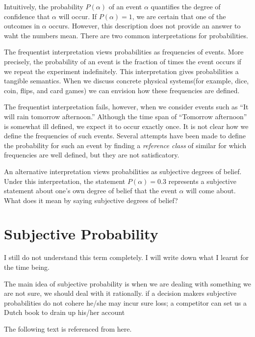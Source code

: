\documentclass[a4paper]{book}
\begin{document}
	Intuitively, the probability $P(\alpha)$ of an event $\alpha$
	quantifies the degree of confidence that $\alpha$ will occur. If
	$P(\alpha) = 1$, we are certain that one of the outcomes in $\alpha$
	occurs. However, this description does not provide an answer to waht
	the numbers mean. There are two common interpretations for
	probabilities.\cite{koller2009probabilistic}

	The frequentist interpretation views probabilities as frequencies of
	events. More precisely, the probability of an event is the fraction of
	times the event occurs if we repeat the experiment indefinitely. This
	interpretation gives probabilities a tangible semantics. When we
	discuss concrete physical systems(for example, dice, coin, flips, and
	card games) we can envision how these frequencies are
	defined.\cite{koller2009probabilistic}

	The frequentist interpretation fails, however, when we consider events
	such as ``It will rain tomorrow afternoon.'' Although the time span of
	``Tomorrow afternoon'' is somewhat ill defined, we expect it to occur
	exactly once. It is not clear how we define the frequencies of such
	events. Several attempts have been made to define the probability for
	such an event by finding a \textit{reference class} of similar for
	which frequencies are well defined, but they are not
	satisficatory.\cite{koller2009probabilistic}

	An alternative interpretation views probabilities as subjective
	degrees of belief. Under this interpretation, the statement $P(\alpha)
	= 0.3$ represents a subjective statement about one's own degree of
	belief that the event $\alpha$ will come
	about.\cite{koller2009probabilistic} What does it mean by saying
	subjective degrees of belief?

\section{Subjective Probability}
	I still do not understand this term completely. I will write down what
	I learnt for the time being.

	The main idea of subjective probability is when we are dealing with
	something we are not sure, we should deal with it rationally.  if a
	decision makers subjective probabilities do not cohere he/she may
	incur sure loss; a competitor can set us a Dutch book to drain up
	his/her account

	The following text is referenced from here\cite{hogg2012introduction}.
\end{document}
